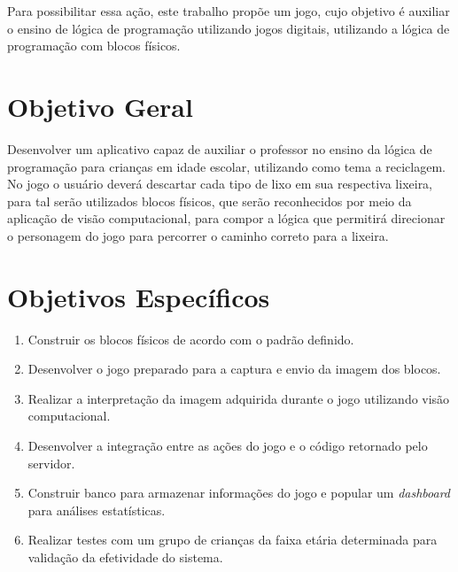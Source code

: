 Para possibilitar essa ação, este trabalho propõe um jogo, cujo objetivo é auxiliar o ensino de lógica de programação utilizando jogos digitais, utilizando a lógica de programação com blocos físicos.

\section{Objetivo Geral}

Desenvolver um aplicativo capaz de auxiliar o professor no ensino da lógica de programação para crianças em idade escolar, utilizando como tema a reciclagem. No jogo o usuário deverá descartar cada tipo de lixo em sua respectiva lixeira, para tal serão utilizados blocos físicos, que serão reconhecidos por meio da aplicação de visão computacional, para compor a lógica que permitirá direcionar o personagem do jogo para percorrer o caminho correto para a lixeira.

\section{Objetivos Específicos}

\begin{enumerate}
    \item Construir os blocos físicos de acordo com o padrão definido.
    \item Desenvolver o jogo preparado para a captura e envio da imagem dos blocos.
    \item Realizar a interpretação da imagem adquirida durante o jogo utilizando visão computacional.
    \item Desenvolver a integração entre as ações do jogo e o código retornado pelo servidor.
    \item Construir banco para armazenar informações do jogo e popular um \textit{dashboard} para análises estatísticas.
    \item Realizar testes com um grupo de crianças da faixa etária determinada para validação da efetividade do sistema.
\end{enumerate}
